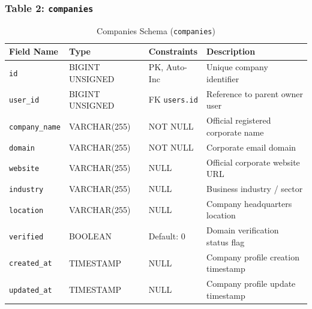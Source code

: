 \subsubsection{Table 2: \texttt{companies}}
\begin{table}[H]
\centering
\small
\caption{Companies Schema (\texttt{companies})}
\label{tab:schema_companies}
\begin{tabular}{|p{3cm}|p{2.8cm}|p{2.2cm}|p{5.5cm}|}
\hline
\textbf{Field Name} & \textbf{Type} & \textbf{Constraints} & \textbf{Description} \\ \hline
\texttt{id} & BIGINT UNSIGNED & PK, Auto-Inc & Unique company identifier \\ \hline
\texttt{user\_id} & BIGINT UNSIGNED & FK \texttt{users.id} & Reference to parent owner user \\ \hline
\texttt{company\_name} & VARCHAR(255) & NOT NULL & Official registered corporate name \\ \hline
\texttt{domain} & VARCHAR(255) & NOT NULL & Corporate email domain \\ \hline
\texttt{website} & VARCHAR(255) & NULL & Official corporate website URL \\ \hline
\texttt{industry} & VARCHAR(255) & NULL & Business industry / sector \\ \hline
\texttt{location} & VARCHAR(255) & NULL & Company headquarters location \\ \hline
\texttt{verified} & BOOLEAN & Default: 0 & Domain verification status flag \\ \hline
\texttt{created\_at} & TIMESTAMP & NULL & Company profile creation timestamp \\ \hline
\texttt{updated\_at} & TIMESTAMP & NULL & Company profile update timestamp \\ \hline
\end{tabular}
\end{table}

